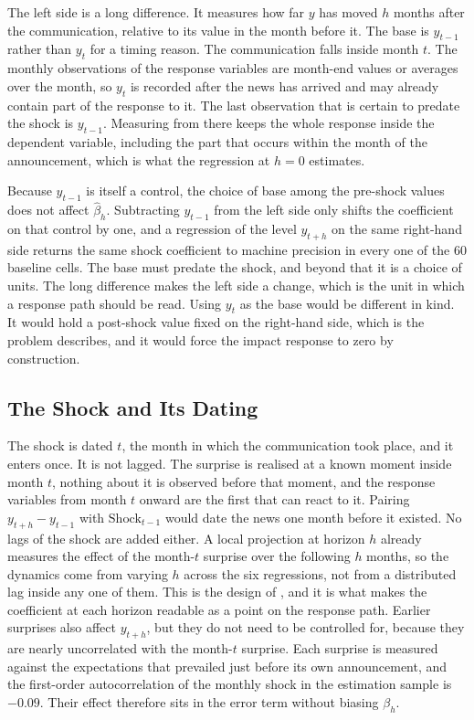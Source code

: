 The left side is a long difference. It measures how far \(y\) has moved \(h\) months after the communication, relative to its value in the month before it. The base is \(y_{t-1}\) rather than \(y_{t}\) for a timing reason. The communication falls inside month \(t\). The monthly observations of the response variables are month-end values or averages over the month, so \(y_{t}\) is recorded after the news has arrived and may already contain part of the response to it. The last observation that is certain to predate the shock is \(y_{t-1}\). Measuring from there keeps the whole response inside the dependent variable, including the part that occurs within the month of the announcement, which is what the regression at \(h=0\) estimates.

Because \(y_{t-1}\) is itself a control, the choice of base among the pre-shock values does not affect \(\widehat{\beta}_h\). Subtracting \(y_{t-1}\) from the left side only shifts the coefficient on that control by one, and a regression of the level \(y_{t+h}\) on the same right-hand side returns the same shock coefficient to machine precision in every one of the 60 baseline cells. The base must predate the shock, and beyond that it is a choice of units. The long difference makes the left side a change, which is the unit in which a response path should be read. Using \(y_{t}\) as the base would be different in kind. It would hold a post-shock value fixed on the right-hand side, which is the problem  describes, and it would force the impact response to zero by construction.

\subsection{The Shock and Its Dating}

The shock is dated \(t\), the month in which the communication took place, and it enters once. It is not lagged. The surprise is realised at a known moment inside month \(t\), nothing about it is observed before that moment, and the response variables from month \(t\) onward are the first that can react to it. Pairing \(y_{t+h} - y_{t-1}\) with \(\mathrm{Shock}_{t-1}\) would date the news one month before it existed. No lags of the shock are added either. A local projection at horizon \(h\) already measures the effect of the month-\(t\) surprise over the following \(h\) months, so the dynamics come from varying \(h\) across the six regressions, not from a distributed lag inside any one of them. This is the design of \textcite{Jorda2005}, and it is what makes the coefficient at each horizon readable as a point on the response path. Earlier surprises also affect \(y_{t+h}\), but they do not need to be controlled for, because they are nearly uncorrelated with the month-\(t\) surprise. Each surprise is measured against the expectations that prevailed just before its own announcement, and the first-order autocorrelation of the monthly shock in the estimation sample is \(-0.09\). Their effect therefore sits in the error term without biasing \(\beta_h\).

